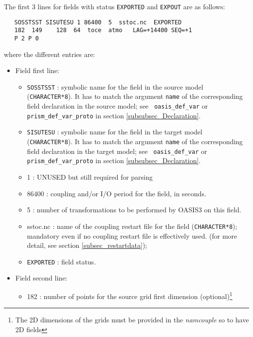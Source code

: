   The first 3 lines for fields with status {\tt EXPORTED} and 
  {\tt EXPOUT} are as follows:
  \begin{verbatim}
   SOSSTSST SISUTESU 1 86400  5  sstoc.nc  EXPORTED
   182  149    128  64  toce  atmo   LAG=+14400 SEQ=+1
   P 2 P 0 
  \end{verbatim}
\vspace{-0.2cm}
  where the different entries are:
    \begin{itemize}
      \item Field first line:
        \begin{itemize}
        \item {\tt SOSSTSST} : symbolic name for the field in the
              source model ({\tt CHARACTER*8}). It has to match the
              argument {\tt name} of the corresponding field
              declaration in the source model; see {\tt
                oasis\_def\_var} or {\tt
              prism\_def\_var\_proto} in section
              \ref{subsubsec_Declaration}.
        \item {\tt SISUTESU} : symbolic name for the field in the
              target model ({\tt CHARACTER*8}).  It has to match the
              argument {\tt name} of the corresponding field
              declaration in the target model; see {\tt
                oasis\_def\_var} or {\tt
              prism\_def\_var\_proto} in section
              \ref{subsubsec_Declaration}.
        \item 1 : UNUSED but still required for parsing
        \item 86400 : coupling and/or I/O period for the field, in
        seconds. 
        \item 5 : number of transformations to be performed by OASIS3 on this field.  
        \item sstoc.nc : name of the coupling restart file for the
          field ({\tt CHARACTER*8}); 
          mandatory even if no coupling restart file is effectively
          used. (for more detail, see section \ref{subsec_restartdata});
        \item {\tt EXPORTED} : field status.
        \end{itemize}
      \item Field second line:
        \begin{itemize}
        \item 182 : number of points for the source grid first
        dimension (optional)\footnote{The 2D dimensions of the grids
          must be provided in the {\it namcouple} so to have 2D fields
}
\end{itemize}
\end{itemize}
